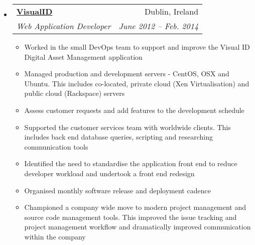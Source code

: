 \documentclass[letterpaper,11pt]{article}
\makeatletter
\newcommand{\resitem}[1]{\item #1 \vspace{-2pt}}
\newcommand{\ressubheading}[4]{
\begin{tabular*}{6.5in}{l@{\extracolsep{\fill}}r}
		\textbf{#1} & #2 \\
		\textit{#3} & \textit{#4} \\
\end{tabular*}\vspace{-6pt}}
\makeatother
\begin{document}
\begin{itemize}
		  \item 
      \ressubheading{\href{http://visualid.com}{VisualID}}{Dublin, Ireland}{Web Application Developer}{June 2012 -- Feb. 2014}
        { 
        \begin{itemize}
      	 \resitem{Worked in the small DevOps team to support and improve the Visual ID Digital Asset Management application}
          \resitem{Managed production and development servers - CentOS, OSX and Ubuntu. This includes co-located, private cloud (Xen Virtualisation) and public cloud (Rackspace) servers}
          \resitem{Assess customer requests and add features to the development schedule}
          \resitem{Supported the customer services team with worldwide clients. This includes back end database queries, scripting and researching communication tools}
          \resitem{Identified the need to standardise the application front end to reduce developer workload and undertook a front end redesign}
          \resitem{Organised monthly software release and deployment cadence}
          \resitem{Championed a company wide move to modern project management and source code management tools. This improved the issue tracking and project management workflow and dramatically improved communication within the company}
        \end{itemize}
        }

\end{itemize}  %
\end{document}
